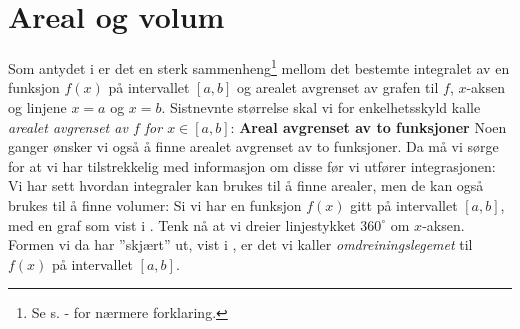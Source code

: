 \section{Areal og volum}
Som antydet i  er det en sterk sammenheng\footnote{Se s. \pageref{bintforklaring}-\pageref{bintslutt} for nærmere forklaring.} mellom det bestemte integralet av en funksjon $ f(x) $ på intervallet $ [a, b] $ og arealet avgrenset av grafen til $ f $, $ x $-aksen og linjene $ {x=a} $ og $ {x=b} $. Sistnevnte størrelse skal vi for enkelhetsskyld kalle \textsl{arealet avgrenset av $ f $ for $x\in [a, b] $}:\newpage
\iar \vsk
\textbf{Areal avgrenset av to funksjoner}\bs
Noen ganger ønsker vi også å finne arealet avgrenset av to funksjoner. Da må vi sørge for at vi har tilstrekkelig med informasjon om disse før vi utfører integrasjonen:\regv
\iarto \newpage
{}
\newpage
{}
Vi har sett hvordan integraler kan brukes til å finne arealer, men de kan også brukes til å finne volumer:\regv
\ivo
\ivoe
\newpage
{}
Si vi har en funksjon $ f(x) $ gitt på intervallet $ [a, b] $, med en graf som vist i . Tenk nå at vi dreier linjestykket $ 360^\circ $ om $ x $-aksen. Formen vi da har ''skjært'' ut, vist i , er det vi kaller \textit{omdreiningslegemet} til $ f(x) $ på intervallet $ [a, b] $.
